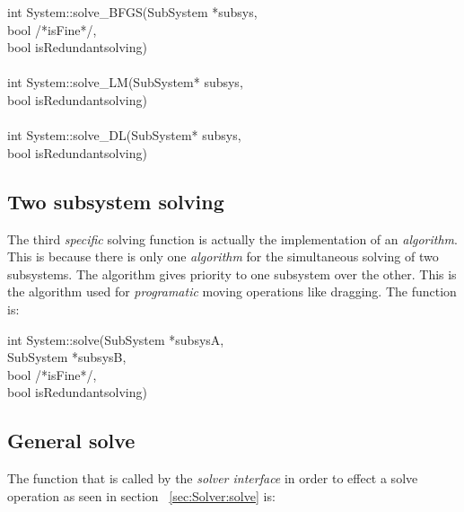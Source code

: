 \documentclass[12pt,twoside,a4paper]{book}
\begin{document}
    \begin{codequote}
    int System::solve\_BFGS(SubSystem *subsys,\\
    \-\hspace{3cm}bool /*isFine*/, \\
    \-\hspace{3cm}bool isRedundantsolving)\\
    \\
    int System::solve\_LM(SubSystem* subsys,\\
    \-\hspace{3cm}bool isRedundantsolving)\\
    \\
    int System::solve\_DL(SubSystem* subsys,\\
    \-\hspace{3cm}bool isRedundantsolving)
    \end{codequote}

    \subsection{Two subsystem solving}

    The third \emph{specific} solving function is actually the implementation of an \emph{algorithm}. This is because there is only one \emph{algorithm} for the simultaneous solving of two subsystems. The algorithm gives priority to one subsystem over the other. This is the algorithm used for \emph{programatic} moving operations like dragging. The function is:

    \begin{codequote}
    int System::solve(SubSystem *subsysA,\\
    \-\hspace{3cm}SubSystem *subsysB,\\
    \-\hspace{3cm}bool /*isFine*/,\\
    \-\hspace{3cm}bool isRedundantsolving)
    \end{codequote}


    \subsection{General solve}

    The function that is called by the \emph{solver interface} in order to effect a solve operation as seen in section ~\ref{sec:Solver:solve} is:
\end{document}
